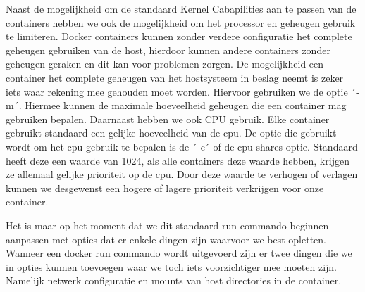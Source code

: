 Naast de mogelijkheid om de standaard Kernel Cabapilities aan te passen van de containers hebben we ook de mogelijkheid om het processor en geheugen gebruik te limiteren. Docker containers kunnen zonder verdere configuratie het complete geheugen gebruiken van de host, hierdoor kunnen andere containers zonder geheugen geraken en dit kan voor problemen zorgen. De mogelijkheid een container het complete geheugen van het hostsysteem in beslag neemt is zeker iets waar rekening mee gehouden moet worden. Hiervoor gebruiken we de optie ´-m´. Hiermee kunnen de maximale hoeveelheid geheugen die een container mag gebruiken bepalen. Daarnaast hebben we ook CPU gebruik. Elke container gebruikt standaard een gelijke hoeveelheid van de cpu. De optie die gebruikt wordt om het cpu gebruik te bepalen is de ´-c´ of de cpu-shares optie. Standaard heeft deze een waarde van 1024, als alle containers deze waarde hebben, krijgen ze allemaal gelijke prioriteit op de cpu. Door deze waarde te verhogen of verlagen kunnen we desgewenst een hogere of lagere prioriteit verkrijgen voor onze container. 

Het is maar op het moment dat we dit standaard run commando beginnen aanpassen met opties dat er enkele dingen zijn waarvoor we best opletten. Wanneer een docker run commando wordt uitgevoerd zijn er twee dingen die we in opties kunnen toevoegen waar we toch iets voorzichtiger mee moeten zijn. Namelijk netwerk configuratie en mounts van host directories in de container.

